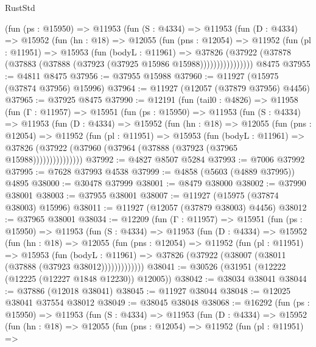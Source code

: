 \begin{lexlean}{RustStd}
\begin{coremodule}
          (fun (ps : @15950) =>
          @11953
            (fun (S : @4334) =>
            @11953
              (fun (D : @4334) =>
              @15952
                (fun (hn : @18) =>
                @12055
                  (fun (pns : @12054) =>
                  @11952
                    (fun (pl : @11951) =>
                    @15953
                      (fun (bodyL : @11961) =>
                      @37826
                        (@37922
                          (@37878 (@37883 (@37888 (@37923 (@37925 @15986 @15988))))))))))))))))
    @8475
@37955 := @4811 @8475
@37956 := @37955 @15988
@37960 := @11927 (@15975 (@37874 @37956) @15996)
@37964 := @11927 (@12057 (@37879 @37956) @4456)
@37965 := @37925 @8475
@37990 := @12191
    (fun (tail0 : @4826) =>
    @11958
      (fun (Γ : @11957) =>
      @15951
        (fun (ps : @15950) =>
        @11953
          (fun (S : @4334) =>
          @11953
            (fun (D : @4334) =>
            @15952
              (fun (hn : @18) =>
              @12055
                (fun (pns : @12054) =>
                @11952
                  (fun (pl : @11951) =>
                  @15953
                    (fun (bodyL : @11961) =>
                    @37826 (@37922 (@37960 (@37964 (@37888 (@37923 (@37965 @15988)))))))))))))))
@37992 := @4827 @8507 @5284
@37993 := @7006 @37992
@37995 := @7628 @37993 @4538
@37999 := @4858 (@5603 (@4889 @37995)) @4895
@38000 := @30478 @37999
@38001 := @8479 @38000
@38002 := @37990 @38001
@38003 := @37955 @38001
@38007 := @11927 (@15975 (@37874 @38003) @15996)
@38011 := @11927 (@12057 (@37879 @38003) @4456)
@38012 := @37965 @38001
@38034 := @12209
    (fun (Γ : @11957) =>
    @15951
      (fun (ps : @15950) =>
      @11953
        (fun (S : @4334) =>
        @11953
          (fun (D : @4334) =>
          @15952
            (fun (hn : @18) =>
            @12055
              (fun (pns : @12054) =>
              @11952
                (fun (pl : @11951) =>
                @15953
                  (fun (bodyL : @11961) =>
                  @37826 (@37922 (@38007 (@38011 (@37888 (@37923 @38012)))))))))))))
@38041 := @30526 (@31951 (@12222 (@12225 (@12227 @1848 @12230)) @12005))
@38042 := @38034 @38041
@38044 := @37886 (@12018 @38041)
@38045 := @11927 @38044
@38048 := @12025 @38041 @37554 @38012
@38049 := @38045 @38048
@38068 := @16292
    (fun (ps : @15950) =>
    @11953
      (fun (S : @4334) =>
      @11953
        (fun (D : @4334) =>
        @15952
          (fun (hn : @18) =>
          @12055
            (fun (pns : @12054) =>
            @11952
              (fun (pl : @11951) =>

\end{coremodule}
\end{lexlean}
